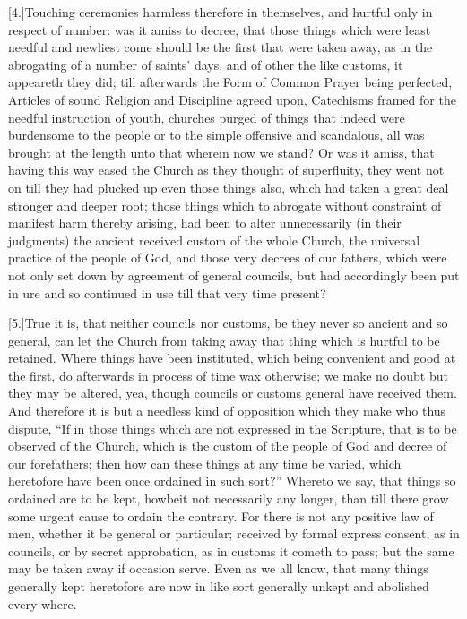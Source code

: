 [4.]Touching ceremonies harmless therefore in themselves, and hurtful only in respect of number: was it amiss to decree, that those things which were least needful and newliest come should be the first that were taken away, as in the abrogating of a number of saints’ days, and of other the like customs, it appeareth they did; till afterwards the Form of Common Prayer being perfected, Articles of sound Religion and Discipline agreed upon, Catechisms framed for the needful instruction of youth, churches purged of things that indeed were burdensome to the people or to the simple offensive and scandalous, all was brought at the length unto that wherein now we stand? Or was it amiss, that having this way eased  the Church as they thought of superfluity, they went not on till they had plucked up even those things also, which had taken a great deal stronger and deeper root; those things which to abrogate without constraint of manifest harm thereby arising, had been to alter unnecessarily (in their judgments) the ancient received custom of the whole Church, the universal practice of the people of God, and those very decrees of our fathers, which were not only set down by agreement of general councils, but had accordingly been put in ure and so continued in use till that very time present?

[5.]True it is, that neither councils nor customs, be they never so ancient and so general, can let the Church from taking away that thing which is hurtful to be retained. Where things have been instituted, which being convenient and good at the first, do afterwards in process of time wax otherwise; we make no doubt but they may be altered, yea, though councils or customs general have received them. And therefore it is but a needless kind of opposition which they make who thus dispute, “If in those things which are not expressed in the Scripture, that is to be observed of the Church, which is the custom of the people of God and decree of our forefathers; then how can these things at any time be varied, which heretofore have been once ordained in such sort?” Whereto we say, that things so ordained are to be kept, howbeit not necessarily any longer, than till there grow some urgent cause to ordain the contrary. For there is not any positive law of men, whether it be general or particular; received by formal express consent, as in councils, or by secret approbation, as in customs it cometh to pass; but the same may be taken away if occasion serve. Even as we all know, that many things generally kept heretofore are now in like sort generally unkept and abolished every where.

